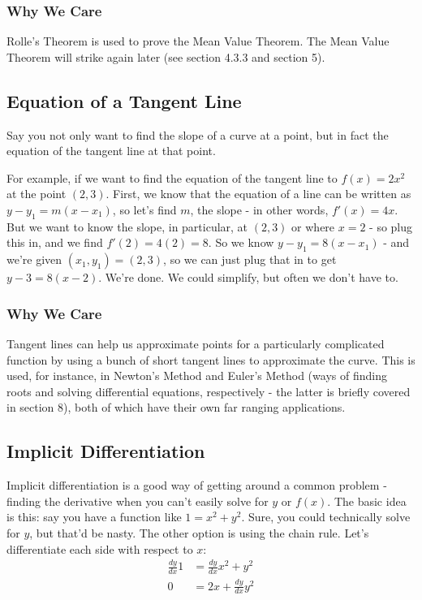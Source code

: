 \subsubsection{Why We Care}

Rolle's Theorem is used to prove the Mean Value Theorem. The Mean Value Theorem will strike again later (see section 4.3.3 and section 5).

\subsection{Equation of a Tangent Line}

Say you not only want to find the slope of a curve at a point, but in fact the equation of the tangent line at that point.

For example, if we want to find the equation of the tangent line to $f(x) = 2x^2$ at the point $(2, 3)$. First, we know that the equation of a line can be written as $y - y_1 = m(x - x_1)$, so let's find $m$, the slope - in other words, $f'(x) = 4x$. But we want to know the slope, in particular, at $(2,3)$ or where $x = 2$ - so plug this in, and we find $f'(2) = 4(2) = 8$. So we know $y - y_1 = 8(x-x_1)$ - and we're given $(x_1, y_1) = (2,3)$, so we can just plug that in to get $y-3 = 8(x-2)$. We're done. We could simplify, but often we don't have to.

\subsubsection{Why We Care}

Tangent lines can help us approximate points for a particularly complicated function by using a bunch of short tangent lines to approximate the curve. This is used, for instance, in Newton's Method and Euler's Method (ways of finding roots and solving differential equations, respectively - the latter is briefly covered in section 8), both of which have their own far ranging applications.

\subsection{Implicit Differentiation}

Implicit differentiation is a good way of getting around a common problem - finding the derivative when you can't easily solve for $y$ or $f(x)$. The basic idea is this: say you have a function like $1 = x^2 + y^2$. Sure, you could technically solve for $y$, but that'd be nasty. The other option is using the chain rule. Let's differentiate each side with respect to $x$:
\begin{align*}
    \frac{dy}{dx} 1 &= \frac{dy}{dx}x^2 + y^2\\
    0 & = 2x + \frac{dy}{dx} y^2
\end{align*}

